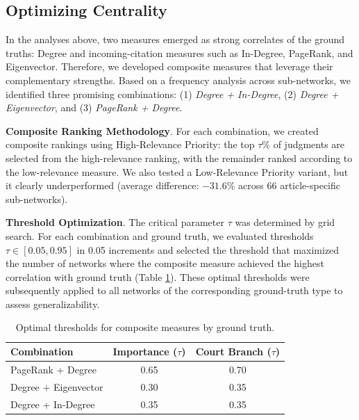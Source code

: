 \documentclass[sigconf]{acmart}
\begin{document}
\subsection{Optimizing Centrality}

In the analyses above, two measures emerged as strong correlates of the ground truths: Degree and incoming-citation measures such as In-Degree, PageRank, and Eigenvector. Therefore, we developed composite measures that leverage their complementary strengths. Based on a frequency analysis across sub-networks, we identified three promising combinations: (1) \textit{Degree + In-Degree}, (2) \textit{Degree + Eigenvector}, and (3) \textit{PageRank + Degree}.

\noindent\textbf{Composite Ranking Methodology}.
For each combination, we created composite rankings using High-Relevance Priority: the top $\tau\%$ of judgments are selected from the high-relevance ranking, with the remainder ranked according to the low-relevance measure. We also tested a Low-Relevance Priority variant, but it clearly underperformed (average difference: $-31.6\%$ across 66 article-specific sub-networks).

\noindent\textbf{Threshold Optimization}.
The critical parameter $\tau$ was determined by grid search. For each combination and ground truth, we evaluated thresholds $\tau \in [0.05, 0.95]$ in 0.05 increments and selected the threshold that maximized the number of networks where the composite measure achieved the highest correlation with ground truth (Table \ref{tab:optimal_thresholds}). These optimal thresholds were subsequently applied to all networks of the corresponding ground-truth type to assess generalizability.


\begin{table}[H]
\centering
\small
\begin{tabular}{lcc}
\toprule
\textbf{Combination} & \textbf{Importance ($\tau$)} & \textbf{Court Branch ($\tau$)} \\ \midrule
PageRank + Degree       & 0.65 & 0.70 \\
Degree + Eigenvector    & 0.30 & 0.35 \\
Degree + In-Degree      & 0.35 & 0.35 \\ \bottomrule
\end{tabular}
\caption{Optimal thresholds for composite measures by ground truth.}
\label{tab:optimal_thresholds}
\end{table}
\end{document}

